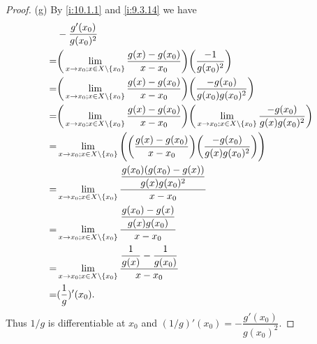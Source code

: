 \begin{proof}{(g)}
  By \cref{i:10.1.1} and \cref{i:9.3.14} we have
  \begin{align*}
      & -\dfrac{g'(x_0)}{g(x_0)^2}                                                                                                                                                          \\
    = & \bigg(\lim_{x \to x_0 ; x \in X \setminus \left\lbrace x_0\right\rbrace} \dfrac{g(x) - g(x_0)}{x - x_0}\bigg) \bigg(\dfrac{-1}{g(x_0)^2}\bigg)                                                          \\
    = & \bigg(\lim_{x \to x_0 ; x \in X \setminus \left\lbrace x_0\right\rbrace} \dfrac{g(x) - g(x_0)}{x - x_0}\bigg) \bigg(\dfrac{-g(x_0)}{g(x_0) g(x_0)^2}\bigg)                                              \\
    = & \bigg(\lim_{x \to x_0 ; x \in X \setminus \left\lbrace x_0\right\rbrace} \dfrac{g(x) - g(x_0)}{x - x_0}\bigg) \bigg(\lim_{x \to x_0 ; x \in X \setminus \left\lbrace x_0\right\rbrace} \dfrac{-g(x_0)}{g(x) g(x_0)^2}\bigg) \\
    = & \lim_{x \to x_0 ; x \in X \setminus \left\lbrace x_0\right\rbrace} \Bigg(\bigg(\dfrac{g(x) - g(x_0)}{x - x_0}\bigg) \bigg(\dfrac{-g(x_0)}{g(x) g(x_0)^2}\bigg)\Bigg)                                    \\
    = & \lim_{x \to x_0 ; x \in X \setminus \left\lbrace x_0\right\rbrace} \dfrac{\dfrac{g(x_0)(g(x_0) - g(x))}{g(x) g(x_0)^2}}{x - x_0}                                                                        \\
    = & \lim_{x \to x_0 ; x \in X \setminus \left\lbrace x_0\right\rbrace} \dfrac{\dfrac{g(x_0) - g(x)}{g(x) g(x_0)}}{x - x_0}                                                                                  \\
    = & \lim_{x \to x_0 ; x \in X \setminus \left\lbrace x_0\right\rbrace} \dfrac{\dfrac{1}{g(x)} - \dfrac{1}{g(x_0)}}{x - x_0}                                                                                 \\
    = & (\dfrac{1}{g})'(x_0).
  \end{align*}
  Thus \(1 / g\) is differentiable at \(x_0\) and \((1 / g)'(x_0) = -\dfrac{g'(x_0)}{g(x_0)^2}\).
\end{proof}

